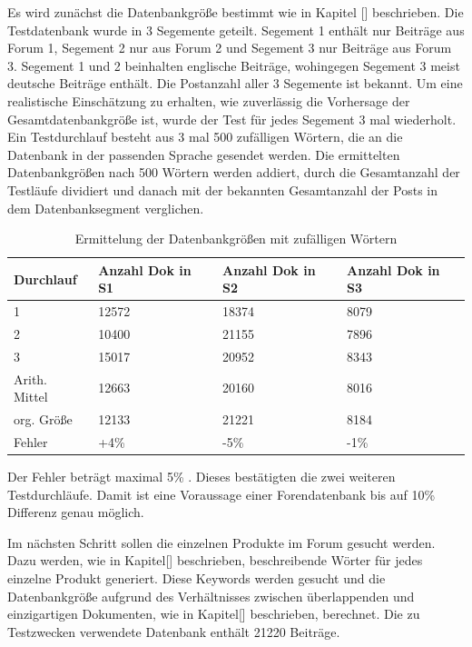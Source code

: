 Es wird zunächst die Datenbankgröße bestimmt wie in Kapitel [] beschrieben. Die Testdatenbank wurde in 3 Segemente geteilt. Segement 1 enthält nur Beiträge aus Forum 1, Segement 2 nur aus Forum 2 und Segement 3 nur Beiträge aus Forum 3. 
Segement 1 und 2 beinhalten englische Beiträge, wohingegen Segement 3 meist deutsche Beiträge enthält. Die Postanzahl aller 3 Segemente ist bekannt. Um eine realistische Einschätzung zu erhalten, wie zuverlässig die Vorhersage der Gesamtdatenbankgröße ist, wurde der Test für jedes Segement 3 mal wiederholt. Ein Testdurchlauf besteht aus 3 mal 500 zufälligen Wörtern, die an die Datenbank in der passenden Sprache gesendet werden. Die ermittelten Datenbankgrößen nach 500 Wörtern werden addiert, durch die Gesamtanzahl der Testläufe dividiert und danach mit der bekannten Gesamtanzahl der Posts in dem Datenbanksegment verglichen.

\begin{table}[h!]
\begin{tabular}{ | p{3cm} | p{3cm} | p{3cm}| p{3cm} |} \hline
Durchlauf & Anzahl Dok in S1 & Anzahl Dok in S2 & Anzahl Dok in S3 \\ \hline
1 & 12572 & 18374 & 8079 \\ \hline
2 & 10400 & 21155 & 7896 \\ \hline
3 & 15017 & 20952 & 8343 \\ \hline
Arith. Mittel & 12663 & 20160 & 8016 \\ \hline
org. Größe & 12133 & 21221 & 8184 \\ \hline
Fehler & +4\% & -5\% & -1\% \\ \hline
\end{tabular}
\caption{Ermittelung der Datenbankgrößen mit zufälligen Wörtern}
\end{table}

\newpage

Der Fehler beträgt maximal 5\% . Dieses bestätigten die zwei weiteren Testdurchläufe. Damit ist eine Voraussage einer Forendatenbank bis auf 10\% Differenz genau möglich.

Im nächsten Schritt sollen die einzelnen Produkte im Forum gesucht werden. Dazu werden, wie in Kapitel[] beschrieben, beschreibende Wörter für jedes einzelne Produkt generiert. Diese Keywords werden gesucht und die Datenbankgröße aufgrund des Verhältnisses zwischen überlappenden und einzigartigen Dokumenten, wie in Kapitel[] beschrieben, berechnet. Die zu Testzwecken verwendete Datenbank enthält 21220 Beiträge.

